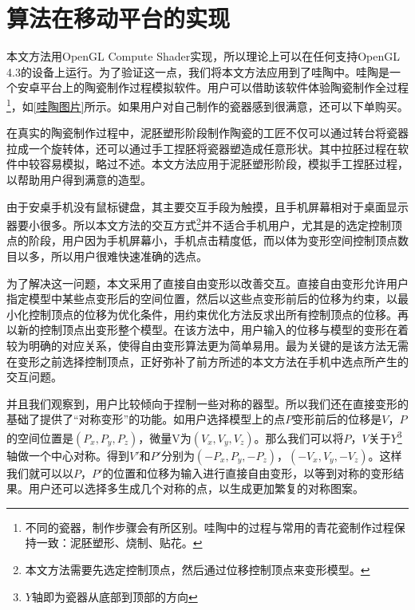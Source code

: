 \chapter{算法在移动平台的实现}
本文方法用OpenGL Compute Shader实现，所以理论上可以在任何支持OpenGL 4.3的设备上运行。为了验证这一点，我们将本文方法应用到了哇陶中。哇陶是一个安卓平台上的陶瓷制作过程模拟软件。用户可以借助该软件体验陶瓷制作全过程\footnote{不同的瓷器，制作步骤会有所区别。哇陶中的过程与常用的青花瓷制作过程保持一致：泥胚塑形、烧制、贴花。}，如\autoref{哇陶图片}所示。如果用户对自己制作的瓷器感到很满意，还可以下单购买。


在真实的陶瓷制作过程中，泥胚塑形阶段制作陶瓷的工匠不仅可以通过转台将瓷器拉成一个旋转体，还可以通过手工捏胚将瓷器塑造成任意形状。其中拉胚过程在软件中较容易模拟，略过不述。本文方法应用于泥胚塑形阶段，模拟手工捏胚过程，以帮助用户得到满意的造型。


由于安桌手机没有鼠标键盘，其主要交互手段为触摸，且手机屏幕相对于桌面显示器要小很多。所以本文方法的交互方式\footnote{本文方法需要先选定控制顶点，然后通过位移控制顶点来变形模型。}并不适合手机用户，尤其是的选定控制顶点的阶段，用户因为手机屏幕小，手机点击精度低，而以体为变形空间控制顶点数目以多，所以用户很难快速准确的选点。

为了解决这一问题，本文采用了直接自由变形\cite{hsu1992}以改善交互。直接自由变形允许用户指定模型中某些点变形后的空间位置，然后以这些点变形前后的位移为约束，以最小化控制顶点的位移为优化条件，用约束优化方法反求出所有控制顶点的位移。再以新的控制顶点出变形整个模型。在该方法中，用户输入的位移与模型的变形在着较为明确的对应关系，使得自由变形算法更为简单易用。最为关键的是该方法无需在变形之前选择控制顶点，正好弥补了前方所述的本文方法在手机中选点所产生的交互问题。

并且我们观察到，用户比较倾向于捏制一些对称的器型。所以我们还在直接变形的基础了提供了“对称变形”的功能。如用户选择模型上的点$P$变形前后的位移是$V$，$P$的空间位置是$(P_x, P_y, P_z)$，微量V为$(V_x, V_y, V_z)$。那么我们可以将$P$，$V$关于$Y$\footnote{$Y$轴即为瓷器从底部到顶部的方向}轴做一个中心对称。得到$V'$和$P'$分别为$(-P_x, P_y, -P_z)$，$(-V_x, V_y, -V_z)$。这样我们就可以以$P$，$P'$的位置和位移为输入进行直接自由变形，以等到对称的变形结果。用户还可以选择多生成几个对称的点，以生成更加繁复的对称图案。

